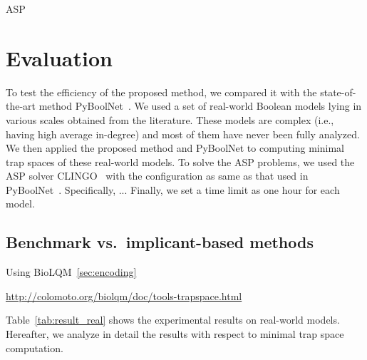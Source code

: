 \documentclass[runningheads]{llncs}
\begin{document}
ASP

\section{Evaluation}
To test the efficiency of the proposed method, we compared it with the state-of-the-art method PyBoolNet~\cite{klarner2017pyboolnet}. We used a set of real-world Boolean models lying in various scales obtained from the literature. These models are complex (i.e., having high average in-degree) and most of them have never been fully analyzed. We then applied the proposed method and PyBoolNet to computing minimal trap spaces of these real-world models. To solve the ASP problems, we used the ASP solver CLINGO~\cite{DBLP:journals/aicom/GebserKKOSS11} with the configuration as same as that used in PyBoolNet~\cite{klarner2015computing}. Specifically, ... Finally, we set a time limit as one hour for each model.

\subsection{Benchmark vs.\ implicant-based methods}

Using BioLQM~\ref{sec:encoding}

\url{http://colomoto.org/biolqm/doc/tools-trapspace.html}

Table~\ref{tab:result_real} shows the experimental results on real-world models. Hereafter, we analyze in detail the results with respect to minimal trap space computation.
\end{document}
